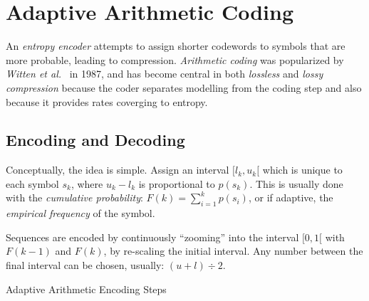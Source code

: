 \documentclass[a4paper, twocolumn]{article}
\begin{document}
    \section{Adaptive Arithmetic Coding} \label{sec:adaptive_arithmetic_coding}
        An \emph{entropy encoder} attempts to assign shorter codewords to symbols that are more probable, leading to compression. \emph{Arithmetic coding} was popularized by \emph{Witten et al.}~\cite{witten1987arithmetic} in 1987, and has become central in both \emph{lossless} and \emph{lossy compression} because the coder separates modelling from the coding step and also because it provides rates coverging to entropy.

        \vspace{-0.1in}
        \subsection{Encoding and Decoding} \label{sec:aac_encoding_decoding}

        Conceptually, the idea is simple. Assign an interval \([l_k, u_k[\) which is unique to each symbol \(s_k\), where \(u_k - l_k\) is proportional to \(p(s_k)\). This is usually done with the \emph{cumulative probability}: \(F(k) = \sum_{i=1}^k p(s_i)\), or if adaptive, the \emph{empirical frequency} of the symbol.

        Sequences are encoded by continuously ``zooming'' into the interval \([0, 1[\) with \(F(k-1)\) and \(F(k)\), by re-scaling the initial interval. Any number between the final interval can be chosen, usually: \((u + l) \div 2\).

        \begin{algorithm}
            \begin{algorithmic}
                \ENDWHILE
            \end{algorithmic}
            \caption{Adaptive Arithmetic Encoding Steps}
            \label{alg:aacz}
        \end{algorithm}
\end{document}
